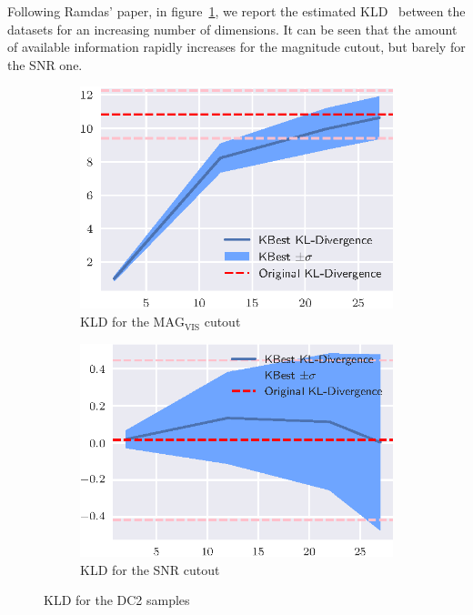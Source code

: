 Following Ramdas' paper, in figure~\ref{fig:divergence_dc2}, we report
the estimated \gls{KLD}~\cite{perez2008kullback} between the datasets for an
increasing number of dimensions. It can be seen that the amount of available information
rapidly increases for the magnitude cutout, but barely for the \gls{SNR} one.

\begin{figure}[htbp]
    \begin{subfigure}[]{0.5\textwidth}
    \includegraphics[width=\textwidth]{images/6_som/divergence/dc2_mag_divergence.eps}
    \caption{\gls{KLD} for the $\text{MAG}_\text{VIS}$ cutout}
    \end{subfigure}
    \hfill
    \begin{subfigure}[]{0.5\textwidth}
    \includegraphics[width=\textwidth]{images/6_som/divergence/dc2_snr_divergence.eps}
    \caption{\gls{KLD} for the \gls{SNR} cutout}
    \end{subfigure}
    \caption{\gls{KLD} for the DC2 samples}
    \label{fig:divergence_dc2}
\end{figure}

